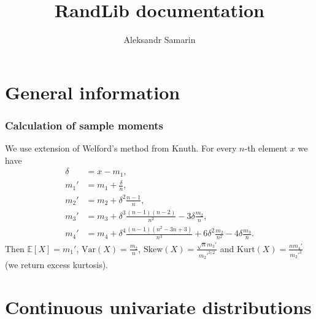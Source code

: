 \documentclass[a4paper,11pt]{article}
\title{RandLib documentation}
\author{Aleksandr Samarin}
\theoremstyle{plain}
\theoremstyle{definition}
\newcommand{\ME}{\mathbb{E}}
\newcommand{\Var}{\mathrm{Var}}
\begin{document}
	
	\maketitle
	\tableofcontents
	
	\part{General information}
	\section{Calculation of sample moments}
	We use extension of Welford's method from Knuth. For every $n$-th element $x$ we have
	\[
	\begin{aligned}
	\delta &= x - m_1, \\
	m_1' &= m_1 +  \frac{\delta}{n}, \\
	m_2' &= m_2 +  \delta^2 \frac{n-1}{n}, \\
	m_3' &= m_3 + \delta^3 \frac{(n-1)(n-2)}{n^2} - 3\delta \frac{m_2}{n}, \\
	m_4' &= m_4 +  \delta^4 \frac{(n-1)(n^2-3n+3)}{n^3}+6\delta^2 \frac{m_2}{n^2}-4\delta\frac{m_3}{n}.
	\end{aligned}
	\]
	Then $\ME[X] = m_1'$, $\Var(X) = \frac{m_2}{n}$, $\mathrm{Skew}(X) = \frac{\sqrt{n}m_3'}{m_2'^{3/2}}$ and $\mathrm{Kurt}(X) = \frac{nm_4'}{m_2'^2}$ (we return excess kurtosis). 
	
	\pagebreak
	\part{Continuous univariate distributions}
\end{document}
